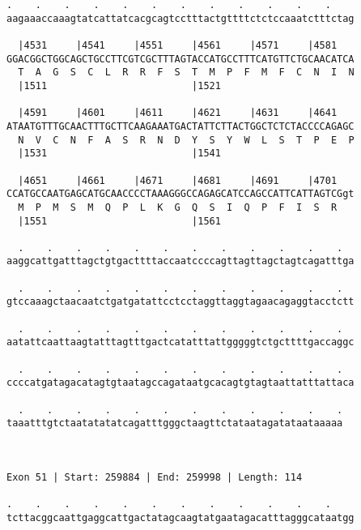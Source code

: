 \documentclass{article}
\begin{document}
\begin{Verbatim}
.    .    .    .    .    .    .    .    .    .    .    .    
aagaaaccaaagtatcattatcacgcagtcctttactgttttctctccaaatctttctag
                                                            
  |4531     |4541     |4551     |4561     |4571     |4581   
GGACGGCTGGCAGCTGCCTTCGTCGCTTTAGTACCATGCCTTTCATGTTCTGCAACATCA
  T  A  G  S  C  L  R  R  F  S  T  M  P  F  M  F  C  N  I  N
  |1511                         |1521                       
  
  |4591     |4601     |4611     |4621     |4631     |4641   
ATAATGTTTGCAACTTTGCTTCAAGAAATGACTATTCTTACTGGCTCTCTACCCCAGAGC
  N  V  C  N  F  A  S  R  N  D  Y  S  Y  W  L  S  T  P  E  P
  |1531                         |1541                       
  
  |4651     |4661     |4671     |4681     |4691     |4701   
CCATGCCAATGAGCATGCAACCCCTAAAGGGCCAGAGCATCCAGCCATTCATTAGTCGgt
  M  P  M  S  M  Q  P  L  K  G  Q  S  I  Q  P  F  I  S  R   
  |1551                         |1561                       
  
  .    .    .    .    .    .    .    .    .    .    .    .  
aaggcattgatttagctgtgacttttaccaatccccagttagttagctagtcagatttga
                                                            
  .    .    .    .    .    .    .    .    .    .    .    .  
gtccaaagctaacaatctgatgatattcctcctaggttaggtagaacagaggtacctctt
                                                            
  .    .    .    .    .    .    .    .    .    .    .    .  
aatattcaattaagtatttagtttgactcatatttattgggggtctgcttttgaccaggc
                                                            
  .    .    .    .    .    .    .    .    .    .    .    .  
ccccatgatagacatagtgtaatagccagataatgcacagtgtagtaattatttattaca
                                                            
  .    .    .    .    .    .    .    .    .    .    .    .
taaatttgtctaatatatatcagatttgggctaagttctataatagatataataaaaa
                                                          
                                                          
 
Exon 51 | Start: 259884 | End: 259998 | Length: 114
 
.    .    .    .    .    .    .    .    .    .    .    .    
tcttacggcaattgaggcattgactatagcaagtatgaatagacatttagggcataatgg
                                                            

\end{Verbatim}
\end{document}
